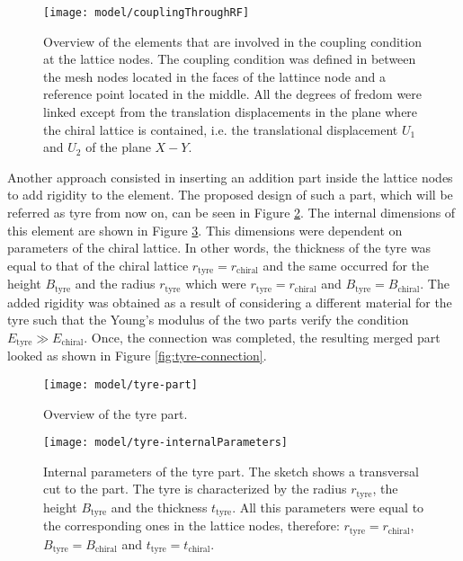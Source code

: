 \begin{figure}[!htpb]
  \centering
  \texttt{[image: model/couplingThroughRF]}
  \caption[Overview of the elements that are involved in the coupling condition at the lattice nodes]{Overview of the elements that are involved in the coupling condition at the lattice nodes. The coupling condition was defined in between the mesh nodes located in the faces of the lattince node and a reference point located in the middle. All the degrees of fredom were linked except from the translation displacements in the plane where the chiral lattice is contained, i.e. the translational displacement $U_1$ and $U_2$ of the plane $X-Y$.}\label{fig:couplingThroughRF}
\end{figure}

Another approach consisted in inserting an addition part inside the lattice nodes to add rigidity to the element. The proposed design of such a part, which will be referred as tyre from now on, can be seen in Figure \ref{fig:tyre-part}. The internal dimensions of this element are shown in Figure \ref{fig:tyre-internalParameters}. This dimensions were dependent on parameters of the chiral lattice. In other words, the thickness of the tyre was equal to that of the chiral lattice $r_{\mathrm{tyre}} = r_{\mathrm{chiral}}$ and the same occurred for the height $B_{\mathrm{tyre}}$ and the radius $r_{\mathrm{tyre}}$ which were $r_{\mathrm{tyre}} = r_{\mathrm{chiral}}$ and $B_{\mathrm{tyre}} = B_{\mathrm{chiral}}$. The added rigidity was obtained as a result of considering a different material for the tyre such that the Young's modulus of the two parts verify the condition $E_{\mathrm{tyre}} \gg E_{\mathrm{chiral}}$. Once, the connection was completed, the resulting merged part looked as shown in Figure \ref{fig:tyre-connection}.

\begin{figure}[!htpb]
  \centering
  \texttt{[image: model/tyre-part]}
  \caption[Overview of the tyre part]{Overview of the tyre part.}\label{fig:tyre-part}
\end{figure}

\begin{figure}[!htpb]
  \centering
  \texttt{[image: model/tyre-internalParameters]}
  \caption[Internal parameters of the tyre part]{Internal parameters of the tyre part. The sketch shows a transversal cut to the part. The tyre is characterized by the radius $r_{\mathrm{tyre}}$, the height $B_{\mathrm{tyre}}$ and the thickness $t_{\mathrm{tyre}}$. All this parameters were equal to the corresponding ones in the lattice nodes, therefore: $r_{\mathrm{tyre}} = r_{\mathrm{chiral}}$, $B_{\mathrm{tyre}} = B_{\mathrm{chiral}}$ and $t_{\mathrm{tyre}} = t_{\mathrm{chiral}}$.}\label{fig:tyre-internalParameters}
\end{figure}

